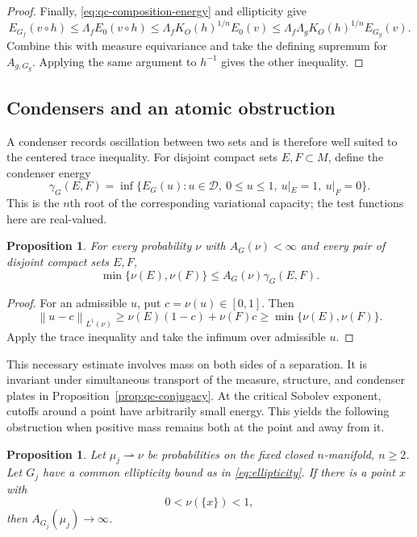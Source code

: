\documentclass[10pt,a4paper]{amsart}
\newtheorem{proposition}[theorem]{Proposition}
\newcommand{\Dcal}{\mathcal D}
\newcommand{\norm}[1]{\left\lVert #1\right\rVert}
\numberwithin{equation}{section}
\begin{document}
\begin{proof}
Finally, \eqref{eq:qc-composition-energy} and ellipticity give
\[
 E_{G_f}(v\circ h)
 \le\Lambda_f E_0(v\circ h)
 \le\Lambda_f K_O(h)^{1/n}E_0(v)
 \le\Lambda_f\Lambda_g K_O(h)^{1/n}E_{G_g}(v).
\]
Combine this with measure equivariance and take the defining supremum for $A_{g,G_g}$. Applying the same argument to $h^{-1}$ gives the other inequality.
\end{proof}

\subsection{Condensers and an atomic obstruction}

A condenser records oscillation between two sets and is therefore well suited to the centered trace inequality. For disjoint compact sets $E,F\subset M$, define the condenser energy
\[
 \gamma_G(E,F)=\inf\{E_G(u):u\in\Dcal,\ 0\le u\le1,
                    \ u|_E=1,\ u|_F=0\}.
\]
This is the $n$th root of the corresponding variational capacity; the test functions here are real-valued.

\begin{proposition}\label{prop:condenser}
For every probability $\nu$ with $A_G(\nu)<\infty$ and every pair of disjoint compact sets $E,F$,
\begin{equation}\label{eq:condenser-necessary}
 \min\{\nu(E),\nu(F)\}\le A_G(\nu)\gamma_G(E,F).
\end{equation}
\end{proposition}

\begin{proof}
For an admissible $u$, put $c=\nu(u)\in[0,1]$. Then
\[
 \norm{u-c}_{L^1(\nu)}
 \ge\nu(E)(1-c)+\nu(F)c
 \ge\min\{\nu(E),\nu(F)\}.
\]
Apply the trace inequality and take the infimum over admissible $u$.
\end{proof}

This necessary estimate involves mass on both sides of a separation. It is invariant under simultaneous transport of the measure, structure, and condenser plates in Proposition~\ref{prop:qc-conjugacy}. At the critical Sobolev exponent, cutoffs around a point have arbitrarily small energy. This yields the following obstruction when positive mass remains both at the point and away from it.

\begin{proposition}\label{prop:atomic-obstruction}
Let $\mu_j\rightharpoonup\nu$ be probabilities on the fixed closed $n$-manifold, $n\ge2$. Let $G_j$ have a common ellipticity bound as in \eqref{eq:ellipticity}. If there is a point $x$ with
\[
 0<\nu(\{x\})<1,
\]
then $A_{G_j}(\mu_j)\to\infty$.
\end{proposition}
\end{document}
